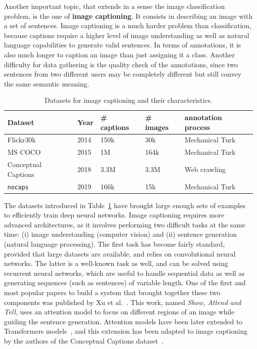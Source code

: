 Another important topic, that extends in a sense the image classification problem,
is the one of \textbf{image captioning}.
It consists in describing an image with a set of sentences.
Image captioning is a much harder problem than classification,
because captions require a higher level of image understanding as well as
natural language capabilities to generate valid sentences.
In terms of annotations, it is also much longer to caption
an image than just assigning it a class.
Another difficulty for data gathering is the quality check of the annotations,
since two sentences from two different users may be
completely different but still convey the same semantic meaning.

\begin{table}
\centering
\caption{Datasets for image captioning and their characteristics.}
\begin{tabular}{lllll}
	Dataset & Year & \# captions & \# images & annotation process \\
	\midrule
	Flickr30k \cite{flickr30k} & 2014 & 150k & 30k & Mechanical Turk \\
	MS COCO \cite{chen2015microsoft} & 2015 & 1M & 164k & Mechanical Turk \\
	Conceptual Captions \cite{sharma-etal-2018-conceptual} & 2018 & 3.3M & 3.3M & Web crawling \\
	\texttt{nocaps} \cite{agrawal2019nocaps} & 2019 &  166k & 15k & Mechanical Turk \\
\end{tabular}%
\label{tab:caption_ds}
\end{table}

The datasets introduced in Table~\ref{tab:caption_ds} have brought
large enough sets of examples to efficiently train deep neural networks.
Image captioning requires more advanced architectures,
as it involves performing two difficult tasks at the same time:
(i) image understanding (computer vision) and
(ii) sentence generation (natural language processing).
The first task has become fairly standard, provided that large datasets are available,
and relies on convolutional neural networks.
The latter is a well-known task as well,
and can be solved using recurrent neural networks,
which are useful to handle sequential data as well as generating sequences
(such as sentences) of variable length.
One of the first and most popular papers to build a system
that brought together these two components was published by Xu et al.~\cite{xu2015show}.
This work, named \textit{Show, Attend and Tell}, uses an attention model
to focus on different regions of an image while guiding the sentence generation.
Attention models have been later extended to
Transformers models~\cite{vaswani2017attention},
and this extension has been adapted to image captioning by
the authors of the Conceptual Captions dataset~\cite{sharma-etal-2018-conceptual}.

